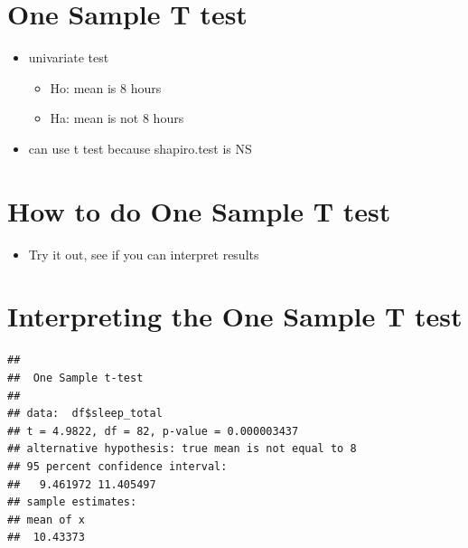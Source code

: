 \documentclass[
]{book}
\newenvironment{Shaded}{\begin{snugshade}}{\end{snugshade}}
\newcommand{\DataTypeTok}[1]{\textcolor[rgb]{0.13,0.29,0.53}{#1}}
\newcommand{\DecValTok}[1]{\textcolor[rgb]{0.00,0.00,0.81}{#1}}
\newcommand{\KeywordTok}[1]{\textcolor[rgb]{0.13,0.29,0.53}{\textbf{#1}}}
\newcommand{\NormalTok}[1]{#1}
\newcommand{\OperatorTok}[1]{\textcolor[rgb]{0.81,0.36,0.00}{\textbf{#1}}}
\newcommand{\StringTok}[1]{\textcolor[rgb]{0.31,0.60,0.02}{#1}}
\providecommand{\tightlist}{%
  \setlength{\itemsep}{0pt}\setlength{\parskip}{0pt}}
\begin{document}
\hypertarget{one-sample-t-test-1}{%
\section{One Sample T test}\label{one-sample-t-test-1}}

\begin{itemize}
\tightlist
\item
  univariate test

  \begin{itemize}
  \tightlist
  \item
    Ho: mean is 8 hours
  \item
    Ha: mean is not 8 hours
  \end{itemize}
\item
  can use t test because shapiro.test is NS
\end{itemize}

\hypertarget{how-to-do-one-sample-t-test-1}{%
\section{How to do One Sample T test}\label{how-to-do-one-sample-t-test-1}}

\begin{Shaded}
\end{Shaded}

\begin{itemize}
\tightlist
\item
  Try it out, see if you can interpret results
\end{itemize}

\hypertarget{interpreting-the-one-sample-t-test-1}{%
\section{Interpreting the One Sample T test}\label{interpreting-the-one-sample-t-test-1}}

\begin{verbatim}
## 
##  One Sample t-test
## 
## data:  df$sleep_total
## t = 4.9822, df = 82, p-value = 0.000003437
## alternative hypothesis: true mean is not equal to 8
## 95 percent confidence interval:
##   9.461972 11.405497
## sample estimates:
## mean of x 
##  10.43373
\end{verbatim}
\end{document}
